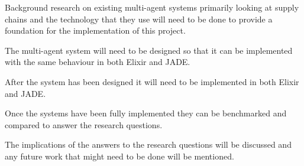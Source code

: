 \begin{description}[style=nextline]
    \item [Literature Review] Background research on existing multi-agent systems primarily looking at supply chains and the technology that they use will need to be done to provide a foundation for the implementation of this project.
    \item [Methodology] The multi-agent system will need to be designed so that it can be implemented with the same behaviour in both Elixir and JADE\@.
    \item [Implementation] After the system has been designed it will need to be implemented in both Elixir and JADE\@.
    \item [Results] Once the systems have been fully implemented they can be benchmarked and compared to answer the research questions.
    \item [Conclusion] The implications of the answers to the research questions will be discussed and any future work that might need to be done will be mentioned.
\end{description}
